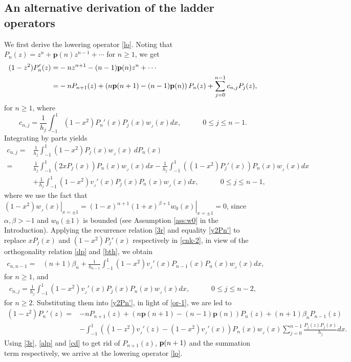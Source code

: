\documentclass[12pt,a4paper]{article}    %
\numberwithin{equation}{section}
\begin{document}
\subsection{An alternative derivation of the ladder operators}\label{proof-J-1}
We first derive the lowering operator \eqref{lo}.	 Noting that $P_n(z)=z^n+\textbf{p}(n)z^{n-1}+\cdots$ for $n\geq1$, we get
\begin{align}
(1-z^2)P_n'(z)=&-nz^{n+1}-(n-1)\textbf p(n)z^n+\cdots\nonumber\\
=&-nP_{n+1}(z)+\left(n \textbf p(n+1)-(n-1)\textbf p(n)\right)P_{n}(z)+\sum_{j=0}^{n-1}c_{n,j}P_j(z),\label{y2Pn'}
\end{align}
for $n\geq1$, where
	\begin{equation*}		 c_{n,j}=\frac{1}{h_j}\int_{-1}^{1}(1-x^2)P_n'(x)P_j(x)w_{_J}(x)dx,\quad\qquad 0\leq j\leq n-1.
	\end{equation*}
Integrating by parts yields
\begin{align}		 c_{n,j}=&\frac{1}{h_j}\int_{-1}^{1}(1-x^2)P_j(x)w_{_J}(x)\,dP_n(x)\nonumber\\		 =&\frac{1}{h_j}\int_{-1}^{1}\left(2xP_j(x)\right)P_n(x)w_{_J}(x)dx-\frac{1}{h_j}\int_{-1}^{1}\left((1-x^2)P_j'(x)\right)P_n(x)w_{_J}(x)dx\nonumber\\		 &+\frac{1}{h_j}\int_{-1}^{1}(1-x^2)v_{_J}'(x)P_j(x)P_n(x)w_{_J}(x)dx,\quad\qquad 0\leq j\leq n-1,\label{cnk-2}
\end{align}
where we use the fact that $\left.(1-x^2)w_{_J}(x)\right|_{x=\pm 1}=\left.(1-x)^{\alpha+1}(1+x)^{\beta+1}w_0(x)\right|_{x=\pm 1}=0$, since $\alpha,\beta>-1$ and $w_0(\pm1)$ is bounded (see Assumption \ref{ass:w0} in the Introduction). Applying the recurrence relation \eqref{3r} and equality \eqref{y2Pn'} to replace $xP_j(x)$ and $(1-x^2)P_j'(x)$ respectively in \eqref{cnk-2}, in view of the orthogonality relation \eqref{dp} and \eqref{bth}, we obtain
\begin{align*}		 c_{n,n-1}=&(n+1)\beta_n+\frac{1}{h_{n-1}}\int_{-1}^{1}(1-x^2)v_{_J}'(x)P_{n-1}(x)P_n(x)w_{_J}(x)dx,
\end{align*}
for $n\geq1$, and
\begin{align*} c_{n,j}=\frac{1}{h_j}\int_{-1}^{1}(1-x^2)v_{_J}'(x)P_j(x)P_n(x)w_{_J}(x)dx, \quad\qquad 0\leq j\leq n-2,
\end{align*}
for $n\geq2$.
Substituting them into \eqref{y2Pn'}, in light of \eqref{or-1}, we are led to
\begin{align*}
(1-z^2)P_n'(z)=&-nP_{n+1}(z)+\left(n\textbf{p}(n+1) - (n-1)\textbf{p}(n)\right)P_n(z)+(n+1)\beta_nP_{n-1}(z)\nonumber\\		 &-\int_{-1}^{1}\left((1-z^2)v_{_J}'(z)-(1-x^2)v_{_J}'(x)\right)P_n(x)w_{_J}(x)\sum_{j=0}^{n-1}\frac{P_j(z)P_j(x)}{h_j}dx.
\end{align*}
Using \eqref{3r}, \eqref{alp} and \eqref{cd} to get rid of $P_{n+1}(z)$, $\textbf p(n+1)$ and the summation term respectively, we arrive at the lowering operator \eqref{lo}.
\end{document}
